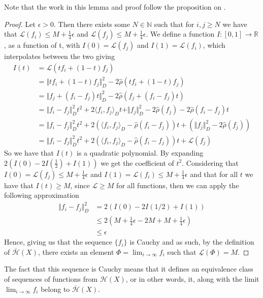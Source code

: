 \documentclass[11pt]{report}
\theoremstyle{definition}
\begin{document}
Note that the work in this lemma and proof follow the proposition on \cite[p.30]{notes}.
\begin{proof}
  Let $\epsilon > 0$. Then there exists some $N \in \mathbb{N}$ such that for $i,j \geq N$ we have that $\mathcal{L}(f_i) \leq M + \frac{1}{4}\epsilon$ and $\mathcal{L}(f_j) \leq M + \frac{1}{4}\epsilon$. We define a function $I:[0,1] \rightarrow \mathbb{R}$, as a function of t, with $I(0) = \mathcal{L}(f_j)$ and $I(1) = \mathcal{L}(f_i)$, which interpolates between the two giving
  \begin{align*}
    I(t) &= \mathcal{L}(tf_i + (1-t)f_j) \\
         &= \Vert tf_i + (1-t)f_j \Vert^2_D - 2\hat{\rho}(tf_i + (1-t)f_j) \\
         &= \Vert f_j + (f_i - f_j)t \Vert^2_D - 2\hat{\rho}(f_j + (f_i - f_j)t) \\
         &= \Vert f_i - f_j \Vert^2_Dt^2 + 2\langle f_i, f_j\rangle_Dt + \Vert f_j \Vert^2_D - 2\hat{\rho}(f_j) - 2\hat{\rho}(f_i - f_j)t \\
         &= \Vert f_i - f_j \Vert^2_Dt^2 + 2(\langle f_i, f_j\rangle_D - \hat{\rho}(f_i - f_j))t + (\Vert f_j \Vert^2_D - 2\hat{\rho}(f_j)) \\
         &= \Vert f_i - f_j \Vert^2_Dt^2 + 2(\langle f_i, f_j\rangle_D - \hat{\rho}(f_i - f_j))t + \mathcal{L}(f_j)
  \end{align*}
  So we have that $I(t)$ is a quadratic polynomial. By expanding $2(I(0) - 2I(\frac{1}{2})+I(1))$ we get the coefficient of $t^2$. Considering that $I(0)= \mathcal{L}(f_j) \leq  M + \frac{1}{4}\epsilon$ and $I(1) = \mathcal{L}(f_i) \leq  M + \frac{1}{4}\epsilon$ and that for all $t$ we have that $I(t) \geq M$, since $\mathcal{L} \geq M$ for all functions, then we can apply the following approximation
  \begin{align*}
    \Vert f_i - f_j \Vert^2_D &= 2(I(0) - 2I(1/2)+I(1)) \\
     &\leq 2(M + \frac{1}{4}\epsilon -2M + M + \frac{1}{4}\epsilon) \\
     &\leq \epsilon
  \end{align*}
  Hence, giving us that the sequence $\{f_i\}$ is Cauchy and as such, by the definition of $\overline{\mathcal{H}}(X)$, there exists an element $\Phi = \lim_{i \rightarrow \infty}f_i$ such that $\underline{\mathcal{L}}(\Phi) = M$.
\end{proof}
The fact that this sequence is Cauchy means that it defines an equivalence class of sequences of functions from $\mathcal{H}(X)$, or in other words, it, along with the limit $\lim_{i \rightarrow \infty} f_i$ belong to $\overline{\mathcal{H}}(X)$.
\end{document}
